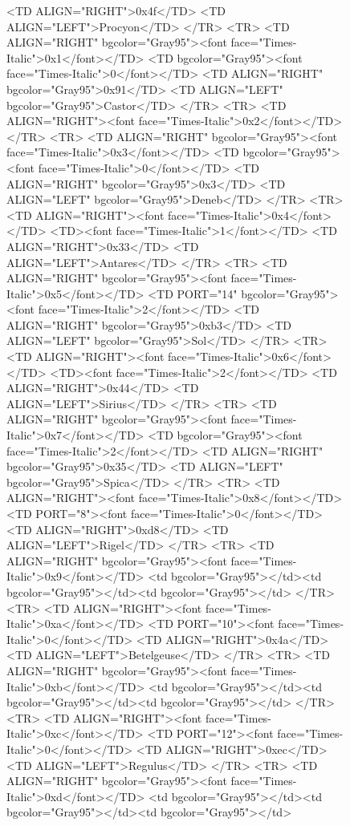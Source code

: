\documentclass[12pt]{article}
\begin{document}
\begin{figure}
{{		<TD ALIGN="RIGHT">0x4f</TD>
		<TD ALIGN="LEFT">Procyon</TD>
	</TR>
	<TR>
		<TD ALIGN="RIGHT" bgcolor="Gray95"><font face="Times-Italic">0x1</font></TD>
		<TD bgcolor="Gray95"><font face="Times-Italic">0</font></TD>
		<TD ALIGN="RIGHT" bgcolor="Gray95">0x91</TD>
		<TD ALIGN="LEFT" bgcolor="Gray95">Castor</TD>
	</TR>
	<TR>
		<TD ALIGN="RIGHT"><font face="Times-Italic">0x2</font></TD>
	</TR>
	<TR>
		<TD ALIGN="RIGHT" bgcolor="Gray95"><font face="Times-Italic">0x3</font></TD>
		<TD bgcolor="Gray95"><font face="Times-Italic">0</font></TD>
		<TD ALIGN="RIGHT" bgcolor="Gray95">0x3</TD>
		<TD ALIGN="LEFT" bgcolor="Gray95">Deneb</TD>
	</TR>
	<TR>
		<TD ALIGN="RIGHT"><font face="Times-Italic">0x4</font></TD>
		<TD><font face="Times-Italic">1</font></TD>
		<TD ALIGN="RIGHT">0x33</TD>
		<TD ALIGN="LEFT">Antares</TD>
	</TR>
	<TR>
		<TD ALIGN="RIGHT" bgcolor="Gray95"><font face="Times-Italic">0x5</font></TD>
		<TD PORT="14" bgcolor="Gray95"><font face="Times-Italic">2</font></TD>
		<TD ALIGN="RIGHT" bgcolor="Gray95">0xb3</TD>
		<TD ALIGN="LEFT" bgcolor="Gray95">Sol</TD>
	</TR>
	<TR>
		<TD ALIGN="RIGHT"><font face="Times-Italic">0x6</font></TD>
		<TD><font face="Times-Italic">2</font></TD>
		<TD ALIGN="RIGHT">0x44</TD>
		<TD ALIGN="LEFT">Sirius</TD>
	</TR>
	<TR>
		<TD ALIGN="RIGHT" bgcolor="Gray95"><font face="Times-Italic">0x7</font></TD>
		<TD bgcolor="Gray95"><font face="Times-Italic">2</font></TD>
		<TD ALIGN="RIGHT" bgcolor="Gray95">0x35</TD>
		<TD ALIGN="LEFT" bgcolor="Gray95">Spica</TD>
	</TR>
	<TR>
		<TD ALIGN="RIGHT"><font face="Times-Italic">0x8</font></TD>
		<TD PORT="8"><font face="Times-Italic">0</font></TD>
		<TD ALIGN="RIGHT">0xd8</TD>
		<TD ALIGN="LEFT">Rigel</TD>
	</TR>
	<TR>
		<TD ALIGN="RIGHT" bgcolor="Gray95"><font face="Times-Italic">0x9</font></TD>
		<td bgcolor="Gray95"></td><td bgcolor="Gray95"></td><td bgcolor="Gray95"></td>
	</TR>
	<TR>
		<TD ALIGN="RIGHT"><font face="Times-Italic">0xa</font></TD>
		<TD PORT="10"><font face="Times-Italic">0</font></TD>
		<TD ALIGN="RIGHT">0x4a</TD>
		<TD ALIGN="LEFT">Betelgeuse</TD>
	</TR>
	<TR>
		<TD ALIGN="RIGHT" bgcolor="Gray95"><font face="Times-Italic">0xb</font></TD>
		<td bgcolor="Gray95"></td><td bgcolor="Gray95"></td><td bgcolor="Gray95"></td>
	</TR>
	<TR>
		<TD ALIGN="RIGHT"><font face="Times-Italic">0xc</font></TD>
		<TD PORT="12"><font face="Times-Italic">0</font></TD>
		<TD ALIGN="RIGHT">0xec</TD>
		<TD ALIGN="LEFT">Regulus</TD>
	</TR>
	<TR>
		<TD ALIGN="RIGHT" bgcolor="Gray95"><font face="Times-Italic">0xd</font></TD>
		<td bgcolor="Gray95"></td><td bgcolor="Gray95"></td><td bgcolor="Gray95"></td>
}}
\end{figure}
\end{document}
